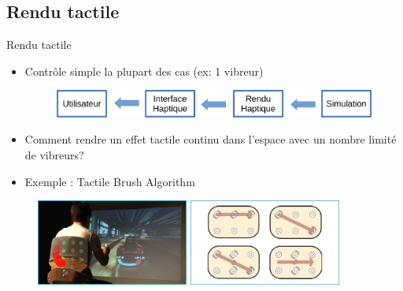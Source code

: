 \documentclass[compress, noflama]{beamer}
\begin{document}
\subsection{Rendu tactile}
\begin{frame}{Rendu tactile}
\begin{itemize}
\item Contrôle simple la plupart des cas (ex: 1 vibreur)
\begin{figure}
\centering
\includegraphics[width=\linewidth]{images/schema_haptique2}{}
\end{figure}
\item Comment rendre un effet tactile continu dans l'espace avec un nombre limité de vibreurs?
\end{itemize}
\begin{itemize}
\item Exemple : Tactile Brush Algorithm \cite{Israr2011}
\end{itemize}
\begin{figure}
\centering
\includegraphics[width=5cm]{images/immersive-tactile-experiences}
\includegraphics[width=5cm]{images/tactile-brush-algorithm}
\end{figure}
\end{frame}
\end{document}
